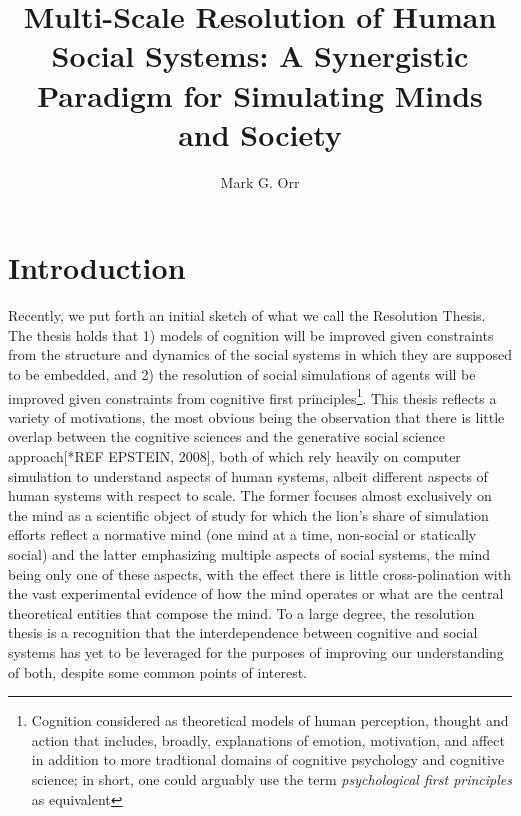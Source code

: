 \documentclass{article}
\title{Multi-Scale Resolution of Human Social Systems:  A Synergistic Paradigm for Simulating Minds and Society}
\author{Mark G. Orr}
\begin{document}
\maketitle

\section{Introduction}
\cite{schelling1969}

Recently, we put forth an initial sketch of what we call the Resolution Thesis\cite{orr2018_brims}.  The thesis holds that 1) models of cognition will be improved given constraints from the structure and dynamics of the social systems in which they are supposed to be embedded, and 2) the resolution of social simulations of agents will be improved given constraints from cognitive first principles\footnote{Cognition considered as theoretical models of human perception, thought and action that includes, broadly, explanations of emotion, motivation, and affect in addition to more tradtional domains of cognitive psychology and cognitive science; in short, one could arguably use the term \textit{psychological first principles} as equivalent}.  This thesis reflects a variety of motivations, the most obvious being the observation that there is little overlap between the cognitive sciences and the generative social science approach[*REF EPSTEIN, 2008], both of which rely heavily on computer simulation to understand aspects of human systems, albeit different aspects of human systems with respect to scale.  The former focuses almost exclusively on the mind as a scientific object of study for which the lion's share of simulation efforts reflect a normative mind (one mind at a time, non-social or statically social) and the latter emphasizing multiple aspects of social systems, the mind being only one of these aspects, with the effect there is little cross-polination with the vast experimental evidence of how the mind operates or what are the central theoretical entities that compose the mind.  To a large degree, the resolution thesis is a recognition that the interdependence between cognitive and social systems has yet to be leveraged for the purposes of improving our understanding of both, despite some common points of interest.    
\end{document}
